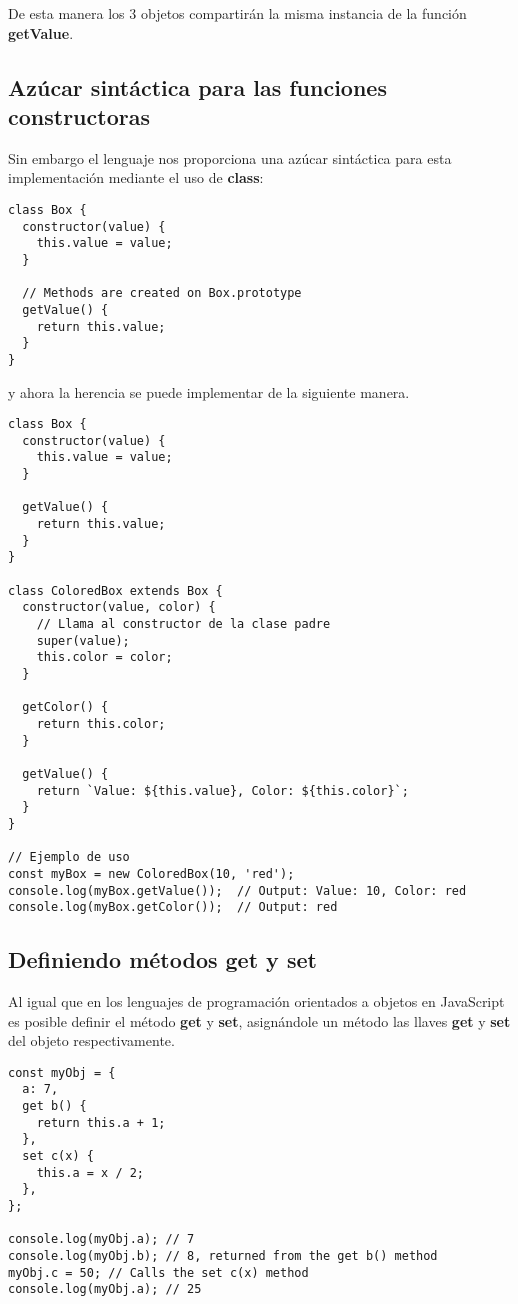 \documentclass{article}
\begin{document}
De esta manera los 3 objetos compartirán la misma instancia de la función \textbf{getValue}.

\subsection{Azúcar sintáctica para las funciones constructoras}

Sin embargo el lenguaje nos proporciona una azúcar sintáctica para esta implementación mediante
el uso de \textbf{class}:

\begin{lstlisting}
class Box {
  constructor(value) {
    this.value = value;
  }

  // Methods are created on Box.prototype
  getValue() {
    return this.value;
  }
}
\end{lstlisting}

y ahora la herencia se puede implementar de la siguiente manera.

\begin{lstlisting}
class Box {
  constructor(value) {
    this.value = value;
  }

  getValue() {
    return this.value;
  }
}

class ColoredBox extends Box {
  constructor(value, color) {
    // Llama al constructor de la clase padre
    super(value);
    this.color = color;
  }

  getColor() {
    return this.color;
  }

  getValue() {
    return `Value: ${this.value}, Color: ${this.color}`;
  }
}

// Ejemplo de uso
const myBox = new ColoredBox(10, 'red');
console.log(myBox.getValue());  // Output: Value: 10, Color: red
console.log(myBox.getColor());  // Output: red

\end{lstlisting}

\subsection{Definiendo métodos get y set}

Al igual que en los lenguajes de programación orientados a objetos en JavaScript es posible definir
el método \textbf{get} y \textbf{set}, asignándole un método las llaves \textbf{get} y \textbf{set}
del objeto respectivamente.

\begin{lstlisting}
const myObj = {
  a: 7,
  get b() {
    return this.a + 1;
  },
  set c(x) {
    this.a = x / 2;
  },
};

console.log(myObj.a); // 7
console.log(myObj.b); // 8, returned from the get b() method
myObj.c = 50; // Calls the set c(x) method
console.log(myObj.a); // 25
\end{lstlisting}
\end{document}
